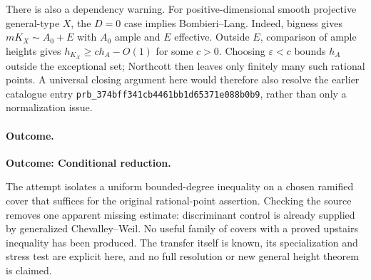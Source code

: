 \documentclass[11pt,a4paper]{article}
\newcommand{\eps}{\varepsilon}
\numberwithin{equation}{section}
\begin{document}
There is also a dependency warning. For positive-dimensional smooth projective general-type $X$, the $D=0$ case implies Bombieri--Lang. Indeed, bigness gives $mK_X\sim A_0+E$ with $A_0$ ample and $E$ effective. Outside $E$, comparison of ample heights gives $h_{K_X}\ge c h_A-O(1)$ for some $c>0$. Choosing $\eps<c$ bounds $h_A$ outside the exceptional set; Northcott then leaves only finitely many such rational points. A universal closing argument here would therefore also resolve the earlier catalogue entry \texttt{prb\_374bff341cb4461bb1d65371e088b0b9}, rather than only a normalization issue.

\paragraph{Outcome.}
\textbf{Outcome: Conditional reduction.}

The attempt isolates a uniform bounded-degree inequality on a chosen ramified cover that suffices for the original rational-point assertion. Checking the source removes one apparent missing estimate: discriminant control is already supplied by generalized Chevalley--Weil. No useful family of covers with a proved upstairs inequality has been produced. The transfer itself is known, its specialization and stress test are explicit here, and no full resolution or new general height theorem is claimed.

\end{document}
